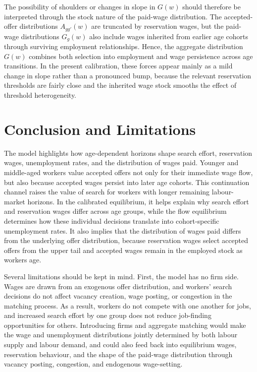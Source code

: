 \documentclass{article}
\begin{document}
The possibility of shoulders or changes in slope in \(G(w)\) should therefore be interpreted through the stock nature of the paid-wage distribution. The accepted-offer distributions \(A_{gg'}(w)\) are truncated by reservation wages, but the paid-wage distributions \(G_g(w)\) also include wages inherited from earlier age cohorts through surviving employment relationships. Hence, the aggregate distribution \(G(w)\) combines both selection into employment and wage persistence across age transitions. In the present calibration, these forces appear mainly as a mild change in slope rather than a pronounced bump, because the relevant reservation thresholds are fairly close and the inherited wage stock smooths the effect of threshold heterogeneity.

\section{Conclusion and Limitations}

The model highlights how age-dependent horizons shape search effort, reservation wages, unemployment rates, and the distribution of wages paid. Younger and middle-aged workers value accepted offers not only for their immediate wage flow, but also because accepted wages persist into later age cohorts. This continuation channel raises the value of search for workers with longer remaining labour-market horizons. In the calibrated equilibrium, it helps explain why search effort and reservation wages differ across age groups, while the flow equilibrium determines how these individual decisions translate into cohort-specific unemployment rates. It also implies that the distribution of wages paid differs from the underlying offer distribution, because reservation wages select accepted offers from the upper tail and accepted wages remain in the employed stock as workers age.

Several limitations should be kept in mind. First, the model has no firm side. Wages are drawn from an exogenous offer distribution, and workers' search decisions do not affect vacancy creation, wage posting, or congestion in the matching process. As a result, workers do not compete with one another for jobs, and increased search effort by one group does not reduce job-finding opportunities for others. Introducing firms and aggregate matching would make the wage and unemployment distributions jointly determined by both labour supply and labour demand, and could also feed back into equilibrium wages, reservation behaviour, and the shape of the paid-wage distribution through vacancy posting, congestion, and endogenous wage-setting.
\end{document}
